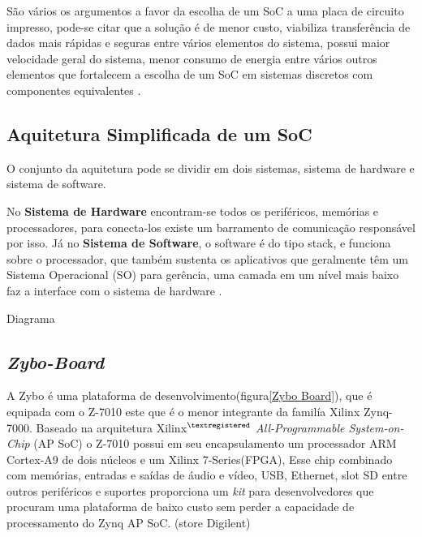 São vários os argumentos a favor da escolha de um SoC a uma placa de circuito impresso, pode-se citar que a solução é de menor custo, viabiliza transferência de dados mais rápidas e seguras entre vários elementos do sistema, possui maior velocidade geral do sistema, menor consumo de energia entre vários outros elementos que fortalecem a escolha de um SoC em sistemas discretos com componentes equivalentes \cite{zynqBook}.

\subsection{Aquitetura Simplificada de um SoC}

O conjunto da aquitetura pode se dividir em dois sistemas, sistema de
hardware  e sistema de software. 


No \textbf{Sistema de Hardware}
encontram-se todos os periféricos,
memórias e processadores, para conecta-los
existe um barramento de comunicação
responsável por isso.
Já no \textbf{Sistema de Software}, o software é do tipo stack, e funciona sobre o
processador, que também sustenta os aplicativos que geralmente têm um
Sistema Operacional (SO) para gerência, uma camada em um nível mais baixo
faz a interface com o sistema de hardware \cite{zynqBook}.

 Diagrama
\subsection{\textit{Zybo-Board}}
A Zybo é uma plataforma de desenvolvimento(figura\ref{Zybo Board}), que é equipada com o Z-7010
este que é  o menor integrante da familía Xilinx Zynq-7000.
Baseado na arquitetura Xilinx$^{\textregistered}$ \textit{All-Programmable System-on-Chip} (AP SoC)
o Z-7010 possui em seu encapsulamento um processador ARM Cortex-A9 de 
dois núcleos e um Xilinx 7-Series(FPGA), Esse chip combinado com memórias, entradas 
e saídas de áudio e vídeo, USB, Ethernet, slot SD entre outros periféricos e suportes
proporciona um \textit{kit} para desenvolvedores que procuram uma plataforma de baixo custo
sem perder a capacidade de processamento do Zynq AP SoC. (store Digilent)  

